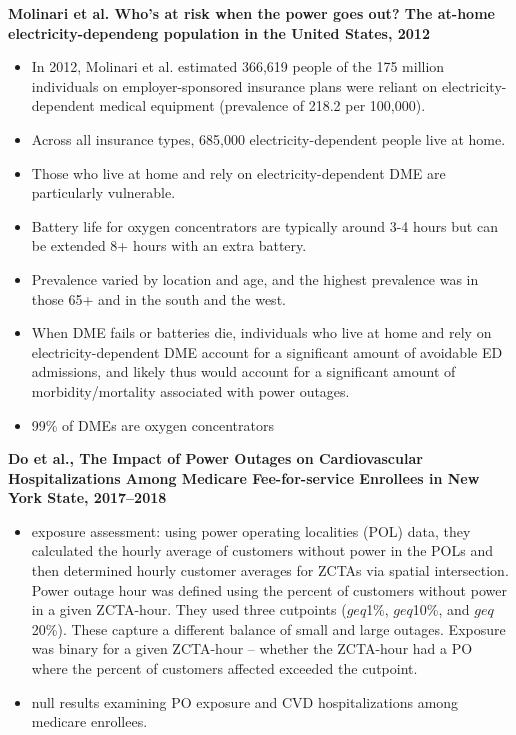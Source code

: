 \textbf{Molinari et al. Who's at risk when the power goes out? The at-home electricity-dependeng population in the United States, 2012}
\begin{itemize}
    \item In 2012, Molinari et al. estimated 366,619 people of the 175 million individuals on employer-sponsored insurance plans were reliant on electricity-dependent medical equipment (prevalence of 218.2 per 100,000). 
    \item Across all insurance types, 685,000 electricity-dependent people live at home. 
    \item Those who live at home and rely on electricity-dependent DME are particularly vulnerable. 
    \item Battery life for oxygen concentrators are typically around 3-4 hours but can be extended 8+ hours with an extra battery. 
    \item Prevalence varied by location and age, and the highest prevalence was in those 65+ and in the south and the west. 
    \item When DME fails or batteries die, individuals who live at home and rely on electricity-dependent DME account for a significant amount of avoidable ED admissions, and likely thus would account for a significant amount of morbidity/mortality associated with power outages. 
    \item 99\% of DMEs are oxygen concentrators
\end{itemize}

\textbf{Do et al., The Impact of Power Outages on Cardiovascular Hospitalizations Among Medicare Fee-for-service Enrollees in New York State, 2017--2018}
\begin{itemize}
    \item exposure assessment: using power operating localities (POL) data, they calculated the hourly average of customers without power in the POLs and then determined hourly customer averages for ZCTAs via spatial intersection. Power outage hour was defined using the percent of customers without power in a given ZCTA-hour. They used three cutpoints ($geq$1\%, $geq$10\%, and $geq$20\%). These capture a different balance of small and large outages. Exposure was binary for a given ZCTA-hour -- whether the ZCTA-hour had a PO where the percent of customers affected exceeded the cutpoint. 
    \item null results examining PO exposure and CVD hospitalizations among medicare enrollees.
    \end{itemize}

